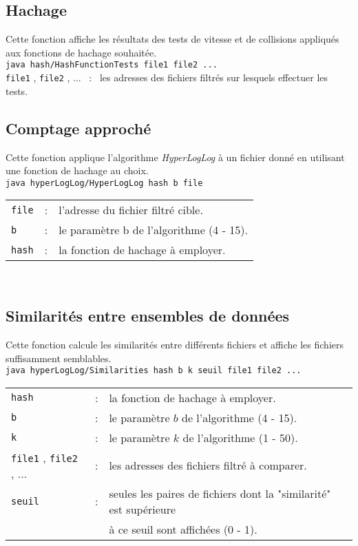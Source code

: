 \documentclass[12pt,a4paper,titlepage]{article}
\newcommand{\code}[1]{ \texttt{\footnotesize #1} }
\begin{document}
\subsection{Hachage}
Cette fonction affiche les résultats des tests de vitesse et de collisions appliqués aux fonctions de hachage souhaitée.\\
\indent\indent\code{java hash/HashFunctionTests file1 file2 ...}\\
\code{file1}, \code{file2}, ... \ : \ les adresses des fichiers filtrés sur lesquels effectuer les tests.\\


\subsection{Comptage approché}
Cette fonction applique l'algorithme \emph{HyperLogLog} à un fichier donné en utilisant une fonction de hachage au choix.\\
\indent\indent\code{java hyperLogLog/HyperLogLog hash b file}\\
\begin{tabular}{lcl}
\code{file} &:& l'adresse du fichier filtré cible.\\
\code{b} &:& le paramètre b de l'algorithme (4 - 15).\\
\code{hash} &:& la fonction de hachage à employer.
\end{tabular}\\


\subsection{Similarités entre ensembles de données}
Cette fonction calcule les similarités entre différents fichiers et affiche les fichiers suffisamment semblables. \\
\indent\indent\code{java hyperLogLog/Similarities hash b k seuil file1 file2 ...}\\
\begin{tabular}{lcl}
\code{hash} &:& la fonction de hachage à employer.\\
\code{b} &:& le paramètre $b$ de l'algorithme (4 - 15).\\
\code{k} &:& le paramètre $k$ de l'algorithme (1 - 50).\\
\code{file1}, \code{file2}, ... &:& les adresses des fichiers filtré à comparer.\\
\code{seuil} &:& seules les paires de fichiers dont la "similarité" est supérieure\\
&& à ce seuil sont affichées (0 - 1).
\end{tabular}\\
\end{document}
